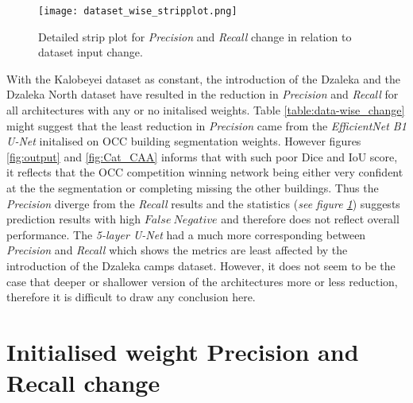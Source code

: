 \documentclass[11pt, a4paper, twoside]{report}
\begin{document}
\begin{figure}[H]
  \centering
  \texttt{[image: dataset\_wise\_stripplot.png]}
  \caption{Detailed strip plot for \textit{Precision} and \textit{Recall} change in relation to dataset input change.}
  \label{fig:data_stripplot}
\end{figure}


With the Kalobeyei dataset as constant, the introduction of the Dzaleka and the Dzaleka North dataset have resulted in the reduction in \textit{Precision} and \textit{Recall} for all architectures with any or no initalised weights. Table \ref{table:data-wise_change} might suggest that the least reduction in \textit{Precision} came from the \textit{EfficientNet B1 U-Net} initalised on OCC building segmentation weights. However figures \ref{fig:output} and \ref{fig:Cat_CAA} informs that with such poor Dice and IoU score, it reflects that the OCC competition winning network being either very confident at the the segmentation or completing missing the other buildings. Thus the \textit{Precision} diverge from the \textit{Recall} results and the statistics (\textit{see figure \ref{fig:data_stripplot}}) suggests prediction results with high $False\ Negative$ and therefore does not reflect overall performance. The \textit{5-layer U-Net} had a much more corresponding between \textit{Precision} and \textit{Recall} which shows the metrics are least affected by the introduction of the Dzaleka camps dataset. However, it does not seem to be the case that deeper or shallower version of the architectures more or less reduction, therefore it is difficult to draw any conclusion here.\\\par

\section{Initialised weight Precision and Recall change}
\end{document}
